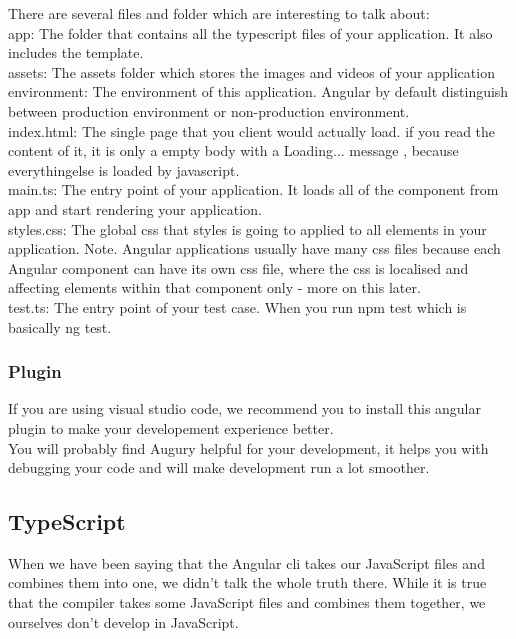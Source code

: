\documentclass[a4paper]{article}
\begin{document}
There are several files and folder which are interesting to talk about:\\

app: The folder that contains all the typescript files of your application. It also includes the template.\\

assets: The assets folder which stores the images and videos of your application\\

environment: The environment of this application. Angular by default distinguish between production environment or non-production environment.\\

index.html: The single page that you client would actually load. if you read the content of it, it is only a empty body with a Loading... message , because everythingelse is loaded by javascript.\\

main.ts: The entry point of your application. It loads all of the component from app and start rendering your application.\\

styles.css: The global css that styles is going to applied to all elements in your application. Note. Angular applications usually have many css files because each Angular component can have its own css file, where the css is localised and affecting elements within that component only - more on this later.\\

test.ts: The entry point of your test case. When you run npm test which is basically ng test.
\subsubsection{Plugin}
If you are using visual studio code, we recommend you to install this angular plugin to make your developement experience better.\\

You will probably find Augury helpful for your development, it helps you with debugging your code and will make development run a lot smoother.
\subsection{TypeScript}
When we have been saying that the Angular cli takes our JavaScript files and combines them into one, we didn’t talk the whole truth there. While it is true that the compiler takes some JavaScript files and combines them together, we ourselves don’t develop in JavaScript.\\
\end{document}
